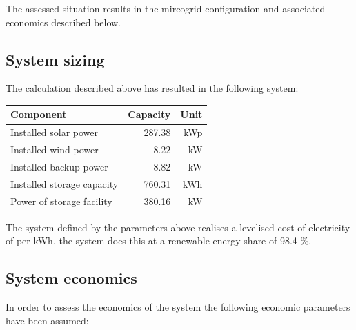 \documentclass{article}[11pt]
\begin{document}
\begin{multicols}{2}
The assessed situation results in the mircogrid configuration and associated economics described below.

\subsection*{System sizing}

The calculation described above has resulted in the following system:

{\color{black}\begin{flushleft}

\begin{tabular}{|l|r|r|}

\hline Component&Capacity&Unit\\ \hline 

Installed solar power&287.38&kWp\\ 

Installed wind power&8.22&kW\\ 

Installed backup power&8.82&kW\\ 

Installed storage capacity&760.31&kWh\\ 

Power of storage facility&380.16&kW\\ 

\hline

\end{tabular}

\label{tab:systemlayout}

\end{flushleft}}\vspace{0.5mm}

The system defined by the parameters above realises a levelised cost of electricity of  per kWh. the system does this at a renewable energy share of 98.4 \%. 

\subsection*{System economics}

In order to assess the economics of the system the following economic parameters have been assumed: 

{\color{black}\begin{flushleft}

\begin{tabular}{|l|r|r|}


\end{tabular}
\end{flushleft}}
\end{multicols}
\end{document}
